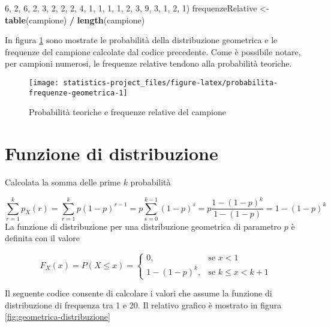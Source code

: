 \documentclass[]{book}
\newenvironment{Shaded}{\begin{snugshade}}{\end{snugshade}}
\newcommand{\KeywordTok}[1]{\textcolor[rgb]{0.13,0.29,0.53}{\textbf{#1}}}
\newcommand{\DecValTok}[1]{\textcolor[rgb]{0.00,0.00,0.81}{#1}}
\newcommand{\StringTok}[1]{\textcolor[rgb]{0.31,0.60,0.02}{#1}}
\newcommand{\OperatorTok}[1]{\textcolor[rgb]{0.81,0.36,0.00}{\textbf{#1}}}
\newcommand{\NormalTok}[1]{#1}
\begin{document}
\begin{Shaded}
\begin{Highlighting}[]
              \DecValTok{6}\NormalTok{, }\DecValTok{2}\NormalTok{, }\DecValTok{6}\NormalTok{, }\DecValTok{2}\NormalTok{, }\DecValTok{3}\NormalTok{, }\DecValTok{2}\NormalTok{, }\DecValTok{2}\NormalTok{, }\DecValTok{2}\NormalTok{, }\DecValTok{4}\NormalTok{, }\DecValTok{1}\NormalTok{, }\DecValTok{1}\NormalTok{, }\DecValTok{1}\NormalTok{, }\DecValTok{1}\NormalTok{, }\DecValTok{2}\NormalTok{, }\DecValTok{3}\NormalTok{, }\DecValTok{9}\NormalTok{, }\DecValTok{3}\NormalTok{, }\DecValTok{1}\NormalTok{, }\DecValTok{2}\NormalTok{, }\DecValTok{1}\NormalTok{)}
\NormalTok{frequenzeRelative <-}\StringTok{ }\KeywordTok{table}\NormalTok{(campione) }\OperatorTok{/}\StringTok{ }\KeywordTok{length}\NormalTok{(campione)}
\end{Highlighting}
\end{Shaded}

In figura \ref{fig:probabilita-frequenze-geometrica} sono mostrate le
probabilità della distribuzione geometrica e le frequenze del campione
calcolate dal codice precedente. Come è possibile notare, per campioni
numerosi, le frequenze relative tendono alla probabilità teoriche.

\begin{figure}

{\centering \texttt{[image: statistics-project\_files/figure-latex/probabilita-frequenze-geometrica-1]} 

}

\caption{Probabilità teoriche e frequenze relative del campione}\label{fig:probabilita-frequenze-geometrica}
\end{figure}

\section{Funzione di distribuzione}\label{funzione-di-distribuzione}

Calcolata la somma delle prime \(k\) probabilità

\[\sum_{r=1}^{k}p_X(r) = \sum_{r=1}^{k}p(1-p)^{r-1} = p \sum_{s = 0}^{k - 1} (1 - p)^s = p \frac{1-(1-p)^k}{1-(1-p)} = 1 - (1 - p)^k\]
La funzione di distribuzione per una distribuzione geometrica di
parametro \(p\) è definita con il valore

\[F_X(x) = P(X \le x) =  \begin{cases} 0, & \mbox{se } x < 1 \\ 1 - (1 - p)^k, & \mbox{se } k \le x < k + 1 \end{cases}\]

Il seguente codice consente di calcolare i valori che assume la funzione
di distribuzione di frequenza tra 1 e 20. Il relativo grafico è mostrato
in figura \ref{fig:geometrica-distribuzione}
\end{document}
